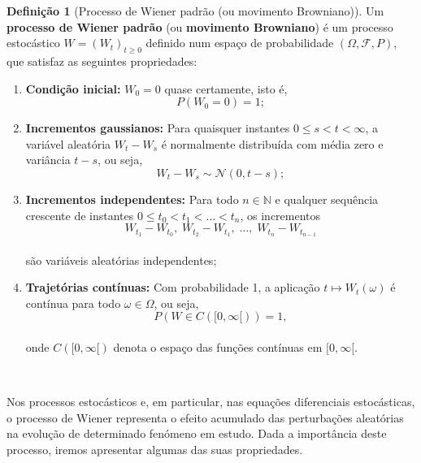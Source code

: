 \documentclass[
  11pt,
  a4paper,
]{book}
\theoremstyle{definition}
\newtheorem{definition}{Definição}[chapter]
\theoremstyle{definition}
\theoremstyle{definition}
\theoremstyle{definition}
\theoremstyle{remark}
\begin{document}
\begin{definition}[Processo de Wiener padrão (ou movimento Browniano)]

Um \textbf{processo de Wiener padrão} (ou \textbf{movimento Browniano}) é um processo estocástico \(W = (W_t)_{t \geq 0}\) definido num espaço de probabilidade \((\Omega, \mathcal{F}, P)\), que satisfaz as seguintes propriedades:

\begin{enumerate}
\def\labelenumi{\arabic{enumi}.}
\item
  \textbf{Condição inicial:} \(W_0 = 0\) quase certamente, isto é,\\
  \[
  P(W_0 = 0) = 1;
  \]
\item
  \textbf{Incrementos gaussianos:} Para quaisquer instantes \(0 \leq s < t < \infty\), a variável aleatória \(W_t - W_s\) é normalmente distribuída com média zero e variância \(t - s\), ou seja,\\
  \[
  W_t - W_s \sim \mathcal{N}(0, t - s);
  \]
\item
  \textbf{Incrementos independentes:} Para todo \(n \in \mathbb{N}\) e qualquer sequência crescente de instantes \(0 \leq t_0 < t_1 < \dots < t_n\), os incrementos\\
  \[
  W_{t_1} - W_{t_0}, \; W_{t_2} - W_{t_1}, \; \dots, \; W_{t_n} - W_{t_{n-1}}
  \]\\
  são variáveis aleatórias independentes;
\item
  \textbf{Trajetórias contínuas:} Com probabilidade 1, a aplicação \(t \mapsto W_t(\omega)\) é contínua para todo \(\omega \in \Omega\), ou seja,\\
  \[
  P\left( W \in C([0, \infty[) \right) = 1,
  \]\\
  onde \(C([0, \infty[)\) denota o espaço das funções contínuas em \([0, \infty[\).
\end{enumerate}

\end{definition}

\(\,\)

Nos processos estocásticos e, em particular, nas equações diferenciais estocásticas, o processo de Wiener representa o efeito acumulado das perturbações aleatórias na evolução de determinado fenómeno em estudo. Dada a importância deste processo, iremos apresentar algumas das suas propriedades.

\(\,\)
\end{document}
